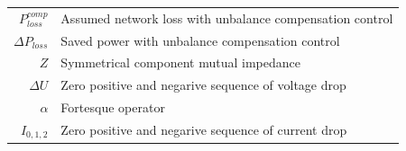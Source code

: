 \begin{longtable}{r|l}
  $P^{comp}_{loss}$                 & Assumed network loss with unbalance compensation control\\
  $\Delta P_{loss}$                 & Saved power with unbalance compensation control\\
	$Z$																& Symmetrical component mutual impedance\\
	$\Delta U$													& Zero positive and negarive sequence of voltage drop\\
	$\alpha$													& Fortesque operator\\
	$I_{0,1,2}$												& Zero positive and negarive sequence of current drop\\
	
	\end{longtable}